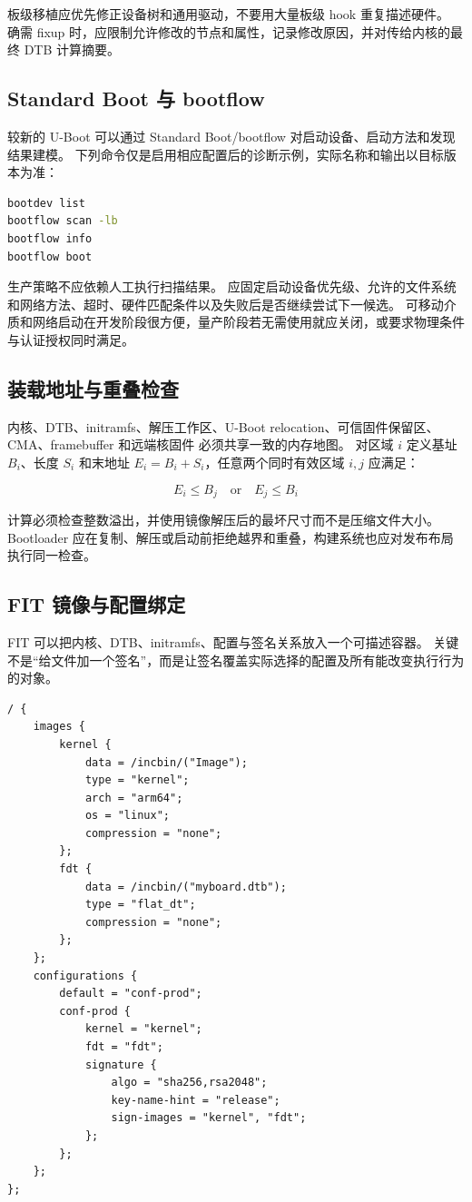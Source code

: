 板级移植应优先修正设备树和通用驱动，不要用大量板级 hook 重复描述硬件。
确需 fixup 时，应限制允许修改的节点和属性，记录修改原因，并对传给内核的最终 DTB 计算摘要。

\subsection{Standard Boot 与 bootflow}

较新的 U-Boot 可以通过 Standard Boot/bootflow 对启动设备、启动方法和发现结果建模\cite{uboot-doc}。
下列命令仅是启用相应配置后的诊断示例，实际名称和输出以目标版本为准：

\begin{lstlisting}[language=bash,caption={U-Boot bootflow 诊断示例}]
bootdev list
bootflow scan -lb
bootflow info
bootflow boot
\end{lstlisting}

生产策略不应依赖人工执行扫描结果。
应固定启动设备优先级、允许的文件系统和网络方法、超时、硬件匹配条件以及失败后是否继续尝试下一候选。
可移动介质和网络启动在开发阶段很方便，量产阶段若无需使用就应关闭，或要求物理条件与认证授权同时满足。

\subsection{装载地址与重叠检查}

内核、DTB、initramfs、解压工作区、U-Boot relocation、可信固件保留区、CMA、framebuffer 和远端核固件
必须共享一致的内存地图。
对区域 $i$ 定义基址 $B_i$、长度 $S_i$ 和末地址 $E_i=B_i+S_i$，任意两个同时有效区域 $i,j$ 应满足：

\begin{equation}
  E_i \le B_j \quad \text{or} \quad E_j \le B_i
\end{equation}

计算必须检查整数溢出，并使用镜像解压后的最坏尺寸而不是压缩文件大小。
Bootloader 应在复制、解压或启动前拒绝越界和重叠，构建系统也应对发布布局执行同一检查。

\subsection{FIT 镜像与配置绑定}

FIT 可以把内核、DTB、initramfs、配置与签名关系放入一个可描述容器。
关键不是“给文件加一个签名”，而是让签名覆盖实际选择的配置及所有能改变执行行为的对象。

\newpage
\begin{lstlisting}[language=dts,caption={FIT 配置与签名关系示意}]
/ {
    images {
        kernel {
            data = /incbin/("Image");
            type = "kernel";
            arch = "arm64";
            os = "linux";
            compression = "none";
        };
        fdt {
            data = /incbin/("myboard.dtb");
            type = "flat_dt";
            compression = "none";
        };
    };
    configurations {
        default = "conf-prod";
        conf-prod {
            kernel = "kernel";
            fdt = "fdt";
            signature {
                algo = "sha256,rsa2048";
                key-name-hint = "release";
                sign-images = "kernel", "fdt";
            };
        };
    };
};
\end{lstlisting}

